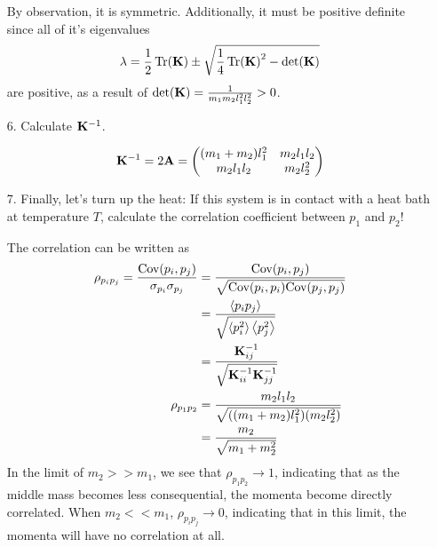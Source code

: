 \documentclass[a4paper,twoside]{article}
\begin{document}
\begin{itemize}
\begin{problem}
            By observation, it is symmetric. Additionally, it must be positive definite since all of it's eigenvalues
            \begin{equation}
                \lambda = \frac{1}{2} \Tr(\vb{K}) \pm \sqrt{\frac{1}{4} \Tr(\vb{K})^2 - \det(\vb{K})}
            \end{equation}
            are positive, as a result of $ \det(\vb{K}) = \frac{1}{m_1 m_2 l_1^2 l_2^2} > 0 $. 
        \end{problem}
    \item[6.] Calculate $ \vb{K}^{-1} $.
        \begin{problem}
            \begin{equation}
                \vb{K}^{-1} = 2 \vb{A} = \mqty( (m_1 + m_2)l_1^2 & m_2 l_1 l_2 \\ m_2 l_1 l_2 & m_2 l_2^2)
            \end{equation}
        \end{problem}
    \item[7.] Finally, let's turn up the heat: If this system is in contact with a heat bath at temperature $ T $, calculate the correlation coefficient between $ p_1 $ and $ p_2 $!
        \begin{problem}
            The correlation can be written as
            \begin{align}
                \rho_{p_i p_j} = \frac{\text{Cov}(p_i, p_j)}{\sigma_{p_i} \sigma_{p_j}} &= \frac{\text{Cov}(p_i, p_j)}{\sqrt{\text{Cov}(p_i, p_i)\text{Cov}(p_j, p_j)}}\\
                &= \frac{\ev{p_i p_j}}{\sqrt{\ev{p_i^2} \ev{p_j^2}}}\\
                &= \frac{\vb{K}_{ij}^{-1}}{\sqrt{\vb{K}_{ii}^{-1} \vb{K}_{jj}^{-1}}}\\
                \rho_{p_1 p_2} &= \frac{m_2 l_1 l_2}{\sqrt{( (m_1 + m_2)l_1^2)(m_2 l_2^2)}}\\
                &= \frac{m_2}{\sqrt{m_1 + m_2^2}}
            \end{align}
            In the limit of $ m_2 >> m_1 $, we see that $ \rho_{p_1 p_2} \to 1 $, indicating that as the middle mass becomes less consequential, the momenta become directly correlated. When $ m_2 << m_1 $, $ \rho_{p_i p_j} \to 0 $, indicating that in this limit, the momenta will have no correlation at all.
        \end{problem}
\end{itemize}
\end{document}
